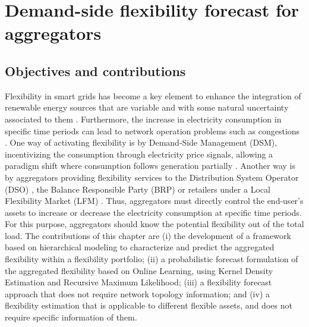 \chapter{Demand-side flexibility forecast for aggregators}
\label{ChapterAggFlexForecast}

\section{Objectives and contributions}
Flexibility in smart grids has become a key element to enhance the integration of renewable energy sources  that  are  variable and  with some  natural  uncertainty  associated  to  them \cite{Ulbig2015, Goutte2019}. Furthermore, the increase in electricity consumption in specific time periods can lead to network operation problems such as congestions \cite{CEDEC2018, LaurA.Nieto-MartinJ.BunnD.Vicente-Pastor2019}. One way of activating flexibility is by Demand-Side Management (DSM), incentivizing the consumption through electricity price signals, allowing a paradigm shift where consumption follows generation partially \cite{Strbac2008}. Another way is by aggregators providing flexibility services to the Distribution System Operator (DSO) \cite{MUNNE-COLLADO2019}, the Balance Responsible Party (BRP) or retailers under a Local Flexibility Market (LFM) \cite{Olivella-Rosell2018, Heinrich2020}. Thus, aggregators must directly control the end-user's assets to increase or decrease the electricity consumption at specific time periods. For this purpose, aggregators should know the potential flexibility out of the total load. 
The contributions of this chapter are (i) the development of a framework based on hierarchical modeling to characterize and predict the aggregated flexibility within a flexibility portfolio; (ii) a probabilistic forecast formulation of the aggregated flexibility based on Online Learning, using Kernel Density Estimation and Recursive Maximum Likelihood; (iii) a flexibility forecast approach that does not require network topology information; and (iv) a flexibility estimation that is applicable to different flexible assets, and does not require specific information of them. 

